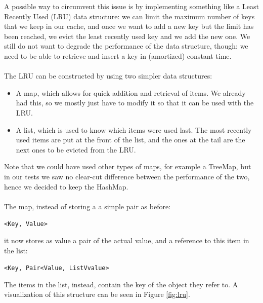 A possible way to circumvent this issue is by implementing something like a Least Recently Used (LRU) data structure: we can limit the maximum number of keys that we keep in our cache, and once we want to add a new key but the limit has been reached, we evict the least recently used key and we add the new one. We still do not want to degrade the performance of the data structure, though: we need to be able to retrieve and insert a key in (amortized) constant time.
\\\\
The LRU can be constructed by using two simpler data structures:
\begin{itemize}  
  \item A map, which allows for quick addition and retrieval of items. We already had this, so we mostly just have to modify it so that it can be used with the LRU.
  \item A list, which is used to know which items were used last. The most recently used items are put at the front of the list, and the ones at the tail are the next ones to be evicted from the LRU.
\end{itemize}
Note that we could have used other types of maps, for example a TreeMap, but in our tests we saw no clear-cut difference between the performance of the two, hence we decided to keep the HashMap.
\\\\
The map, instead of storing a a simple pair as before:
\begin{center}
  \texttt{<Key, Value>}
\end{center}
it now stores as value a pair of the actual value, and a reference to this item in the list:
\begin{center}
  \texttt{<Key, Pair<Value, ListVvalue>}
\end{center}
The items in the list, instead, contain the key of the object they refer to. A visualization of this structure can be seen in Figure \ref{fig:lru}.

